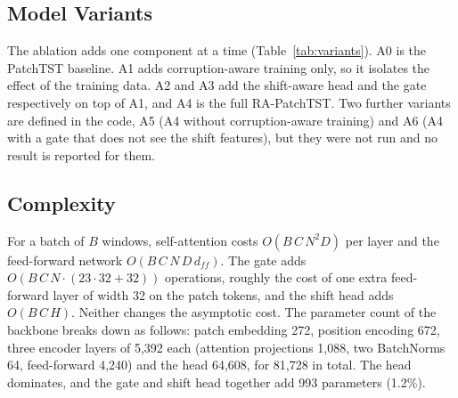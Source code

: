 \subsection{Model Variants}
\label{sec:method-variants}

The ablation adds one component at a time (Table~\ref{tab:variants}). A0 is the PatchTST baseline. A1 adds corruption-aware training only, so it isolates the effect of the training data. A2 and A3 add the shift-aware head and the gate respectively on top of A1, and A4 is the full RA-PatchTST. Two further variants are defined in the code, A5 (A4 without corruption-aware training) and A6 (A4 with a gate that does not see the shift features), but they were not run and no result is reported for them.

\begin{table}[!t]
\centering
\caption{Model Variants of the Ablation}
\label{tab:variants}
\footnotesize
{}
\end{table}

\subsection{Complexity}
\label{sec:method-complexity}

For a batch of $B$ windows, self-attention costs $O(B\,C\,N^2 D)$ per layer and the feed-forward network $O(B\,C\,N\,D\,d_{ff})$. The gate adds $O(B\,C\,N\cdot(23\cdot32+32))$ operations, roughly the cost of one extra feed-forward layer of width 32 on the patch tokens, and the shift head adds $O(B\,C\,H)$. Neither changes the asymptotic cost. The parameter count of the backbone breaks down as follows: patch embedding 272, position encoding 672, three encoder layers of 5,392 each (attention projections 1,088, two BatchNorms 64, feed-forward 4,240) and the head 64,608, for 81,728 in total. The head dominates, and the gate and shift head together add 993 parameters (1.2\%).
